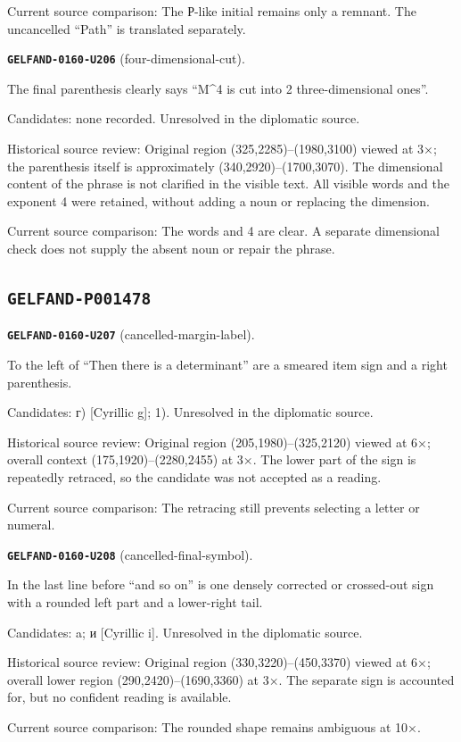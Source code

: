 Current source comparison: The Р-like initial remains only a remnant. The uncancelled “Path” is translated separately.\par\medskip
\par\noindent\leavevmode{}\label{GELFAND-0160-U206}\label{GELFAND-P001477:four-dimensional-cut}\textbf{\texttt{GELFAND-0160-U206}} (four-dimensional-cut).\nopagebreak[4]\par
The final parenthesis clearly says “M\textasciicircum{}4 is cut into 2 three-dimensional ones”.\par
Candidates: none recorded. Unresolved in the diplomatic source.\par
Historical source review: Original region (325,2285)–(1980,3100) viewed at 3×; the parenthesis itself is approximately (340,2920)–(1700,3070). The dimensional content of the phrase is not clarified in the visible text. All visible words and the exponent 4 were retained, without adding a noun or replacing the dimension.\par
Current source comparison: The words and 4 are clear. A separate dimensional check does not supply the absent noun or repair the phrase.\par\medskip
\subsection*{\texttt{GELFAND-P001478}}
\par\noindent\leavevmode{}\label{GELFAND-0160-U207}\label{GELFAND-P001478:cancelled-margin-label}\textbf{\texttt{GELFAND-0160-U207}} (cancelled-margin-label).\nopagebreak[4]\par
To the left of “Then there is a determinant” are a smeared item sign and a right parenthesis.\par
Candidates: г) [Cyrillic g]; 1). Unresolved in the diplomatic source.\par
Historical source review: Original region (205,1980)–(325,2120) viewed at 6×; overall context (175,1920)–(2280,2455) at 3×. The lower part of the sign is repeatedly retraced, so the candidate was not accepted as a reading.\par
Current source comparison: The retracing still prevents selecting a letter or numeral.\par\medskip
\par\noindent\leavevmode{}\label{GELFAND-0160-U208}\label{GELFAND-P001478:cancelled-final-symbol}\textbf{\texttt{GELFAND-0160-U208}} (cancelled-final-symbol).\nopagebreak[4]\par
In the last line before “and so on” is one densely corrected or crossed-out sign with a rounded left part and a lower-right tail.\par
Candidates: a; и [Cyrillic i]. Unresolved in the diplomatic source.\par
Historical source review: Original region (330,3220)–(450,3370) viewed at 6×; overall lower region (290,2420)–(1690,3360) at 3×. The separate sign is accounted for, but no confident reading is available.\par
Current source comparison: The rounded shape remains ambiguous at 10×.\par\medskip
